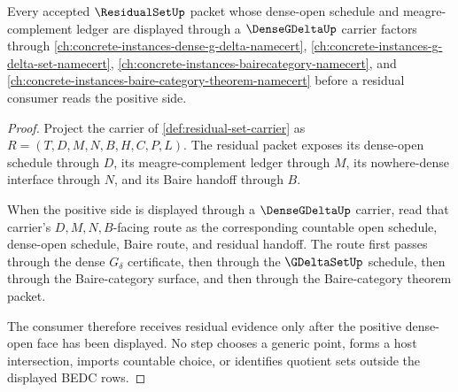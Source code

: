 \begin{theorem}
\label{thm:residual-set-dense-gdelta-boundary}
Every accepted $\ResidualSetUp$ packet whose dense-open schedule and meagre-complement ledger are displayed through a $\DenseGDeltaUp$ carrier factors through \autoref{ch:concrete-instances-dense-g-delta-namecert}, \autoref{ch:concrete-instances-g-delta-set-namecert}, \autoref{ch:concrete-instances-bairecategory-namecert}, and \autoref{ch:concrete-instances-baire-category-theorem-namecert} before a residual consumer reads the positive side.
\end{theorem}
\begin{proof}
Project the carrier of \autoref{def:residual-set-carrier} as $R=(T,D,M,N,B,H,C,P,L)$. The residual packet exposes its dense-open schedule through $D$, its meagre-complement ledger through $M$, its nowhere-dense interface through $N$, and its Baire handoff through $B$.

When the positive side is displayed through a $\DenseGDeltaUp$ carrier, read that carrier's $D,M,N,B$-facing route as the corresponding countable open schedule, dense-open schedule, Baire route, and residual handoff. The route first passes through the dense $G_\delta$ certificate, then through the $\GDeltaSetUp$ schedule, then through the Baire-category surface, and then through the Baire-category theorem packet.

The consumer therefore receives residual evidence only after the positive dense-open face has been displayed. No step chooses a generic point, forms a host intersection, imports countable choice, or identifies quotient sets outside the displayed BEDC rows.
\end{proof}


\begin{closurestatus}{\ResidualSetUp}
  \theoryclosure{\seedClosure}
  \formalstatus{\formalTargetV}
\end{closurestatus}
